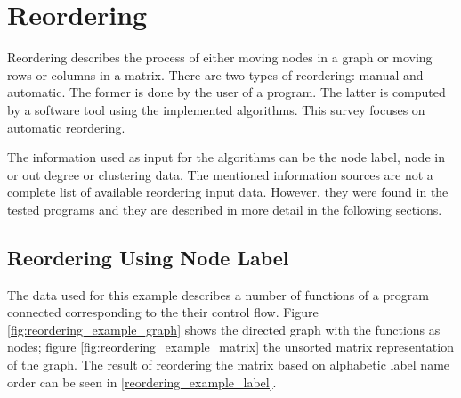%
%
% 
% 
% 


\chapter{Reordering}
\label{chap:reordering}

Reordering describes the process of either moving nodes in a graph or moving rows or columns in a matrix. There are two types of reordering: manual and automatic. The former is done by the user of a program. The latter is computed by a software tool using the implemented algorithms. This survey focuses on automatic reordering.

The information used as input for the algorithms can be the node label, node in or out degree or clustering data. The mentioned information sources are not a complete list of available reordering input data. However, they were found in the tested programs and they are described in more detail in the following sections.


\section{Reordering Using Node Label}
\label{sec:reordering_label}
The data used for this example describes a number of functions of a program connected corresponding to the their control flow. Figure \ref{fig:reordering_example_graph} shows the directed graph with the functions as nodes; figure \ref{fig:reordering_example_matrix} the unsorted matrix representation of the graph. The result of reordering the matrix based on alphabetic label name order can be seen in \ref{reordering_example_label}.

